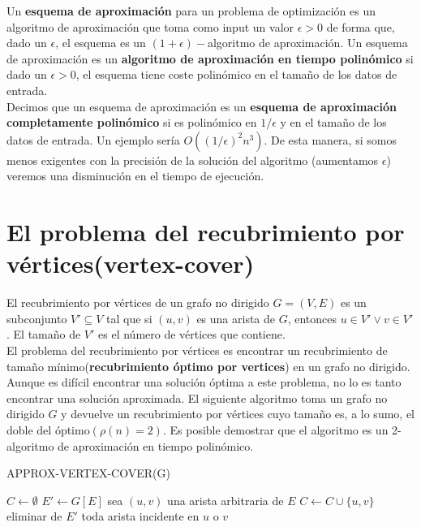 \documentclass{article}
\begin{document}
Un \textbf{esquema de aproximaci\'on} para un problema de optimizaci\'on es un algoritmo de aproximaci\'on que toma como input un valor $\epsilon > 0$ de forma que, dado un $\epsilon$, el esquema es un $(1 + \epsilon)-$algoritmo de aproximaci\'on. Un esquema de aproximaci\'on es un \textbf{algoritmo de aproximaci\'on en tiempo polin\'omico} si dado un $\epsilon > 0$, el esquema tiene coste polin\'omico en el tamaño de los datos de entrada.\\

Decimos que un esquema de aproximaci\'on es un \textbf{esquema de aproximaci\'on completamente polin\'omico} si es polin\'omico en $1/\epsilon$ y en el tamaño de los datos de entrada. Un ejemplo ser\'ia $O((1/\epsilon)^2n^3)$. De esta manera, si somos menos exigentes con la precisi\'on de la solución del algoritmo (aumentamos $\epsilon$) veremos una disminuci\'on en el tiempo de ejecuci\'on.

\section{El problema del recubrimiento por v\'ertices(vertex-cover)}\label{sec:vertexCover}
El recubrimiento por v\'ertices de un grafo no dirigido $G = (V,E)$ es un subconjunto $V' \subseteq V$ tal que si $(u, v)$ es una arista de $G$, entonces $ u \in V' \vee v \in V'$. El tamaño de $V'$ es el n\'umero de v\'ertices que contiene. \\

El problema del recubrimiento por v\'ertices es encontrar un recubrimiento de tamaño m\'inimo(\textbf{recubrimiento \'optimo por vertices}) en un grafo no dirigido. Aunque es dif\'icil encontrar una soluci\'on \'optima a este problema, no lo es tanto encontrar una soluci\'on aproximada. El siguiente algoritmo toma un grafo no dirigido $G$ y devuelve un recubrimiento por v\'ertices cuyo tamaño es, a lo sumo, el doble del \'optimo$(\rho(n) = 2)$. Es posible demostrar que el algoritmo es un 2-algoritmo de aproximaci\'on en tiempo polin\'omico.\\


\begin{algorithm}[H]
\caption{APPROX-VERTEX-COVER(G)}
\begin{algorithmic}[1]
\STATE $C\gets \emptyset $
\STATE $E' \gets G[E]$
\STATE sea $(u,v)$ una arista arbitraria de $E$
\STATE $C \gets C \cup \{u,v\}$
\STATE eliminar de $E'$ toda arista incidente en $u$ o $v$
\ENDWHILE
{}
\end{algorithmic}
\end{algorithm}
\end{document}
